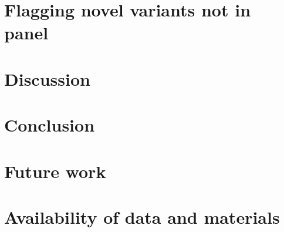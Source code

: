 \section{Flagging novel variants not in panel}

\section{Discussion}
\section{Conclusion}

\section{Future work}

\section{Availability of data and materials}